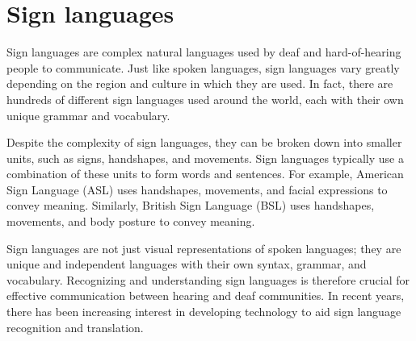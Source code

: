 \section{Sign languages}
Sign languages are complex natural languages used by deaf and hard-of-hearing people to communicate. Just like spoken languages, sign languages vary greatly depending on the region and culture in which they are used. In fact, there are hundreds of different sign languages used around the world, each with their own unique grammar and vocabulary.

Despite the complexity of sign languages, they can be broken down into smaller units, such as signs, handshapes, and movements. Sign languages typically use a combination of these units to form words and sentences. For example, American Sign Language (ASL) uses handshapes, movements, and facial expressions to convey meaning. Similarly, British Sign Language (BSL) uses handshapes, movements, and body posture to convey meaning.

Sign languages are not just visual representations of spoken languages; they are unique and independent languages with their own syntax, grammar, and vocabulary. Recognizing and understanding sign languages is therefore crucial for effective communication between hearing and deaf communities. In recent years, there has been increasing interest in developing technology to aid sign language recognition and translation.